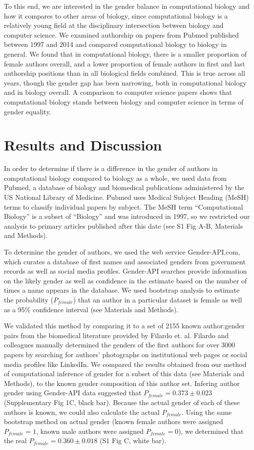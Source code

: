 \documentclass[10pt,letterpaper]{article}
\begin{document}
\begin{flushleft}
To this end, we are interested in the gender balance in computational biology and how it compares to other areas of biology, since computational biology is a relatively young field at the disciplinary intersection between biology and computer science. We examined authorship on papers from Pubmed published between 1997 and 2014 and compared computational biology to biology in general. We found that in computational biology, there is a smaller proportion of female authors overall, and a lower proportion of female authors in first and last authorship positions than in all biological fields combined. This is true across all years, though the gender gap has been narrowing, both in computational biology and in biology overall. A comparison to computer science papers shows that computational biology stands between biology and computer science in terms of gender equality.

\section*{Results and Discussion}
In order to determine if there is a difference in the gender of authors in computational biology compared to biology as a whole, we used data from Pubmed, a database of biology and biomedical publications administered by the US National Library of Medicine. Pubmed uses Medical Subject Heading (MeSH) terms to classify individual papers by subject. The MeSH term “Computational Biology” is a subset of “Biology” and was introduced in 1997, so we restricted our analysis to primary articles published after this date (see S1 Fig A-B, Materials and Methods).

To determine the gender of authors, we used the web service Gender-API.com, which curates a database of first names and associated genders from government records as well as social media profiles. Gender-API searches provide information on the likely gender as well as confidence in the estimate based on the number of times a name appears in the database. We used bootstrap analysis to estimate the probability ($P_{female}$) that an author in a particular dataset is female as well as a 95\% confidence interval (see Materials and Methods).

We validated this method by comparing it to a set of 2155 known author:gender pairs from the biomedical literature provided by Filardo et. al. \cite{Filardo2016} Filardo and colleagues manually determined the genders of the first authors for over 3000 papers by searching for authors’ photographs on institutional web pages or social media profiles like LinkedIn. We compared the results obtained from our method of computational inference of gender for a subset of this data (see Materials and Methods), to the known gender composition of this author set. Infering author gender using Gender-API data suggested that $P_{female} = 0.373 \pm 0.023$ (Supplementary Fig 1C, black bar). Because the actual gender of each of these authors is known, we could also calculate the actual $P_{female}$. Using the same bootstrap method on actual gender (known female authors were assigned $P_{female} = 1$, known male authors were assigned $P_{female} = 0$), we determined that the real $P_{female} = 0.360 \pm 0.018$ (S1 Fig C, white bar).


\end{flushleft}
\end{document}
